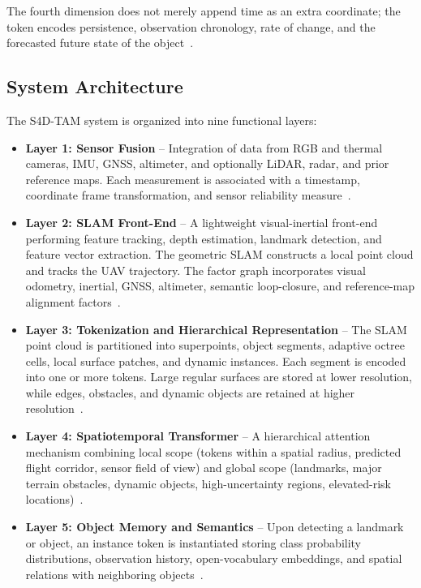 The fourth dimension does not merely append time as an extra coordinate; the token encodes persistence, observation chronology, rate of change, and the forecasted future state of the object~\cite{pomianek2026s4dtam, zheng2024gaussianad, wang2024occsora, ma2023cam4docc, chen2024riskoccupancy}.

\subsection{System Architecture}
\label{subsec:architecture}

The S4D-TAM system is organized into nine functional layers:
\begin{itemize}
  \item \textbf{Layer 1: Sensor Fusion} -- Integration of data from RGB and thermal cameras, IMU, GNSS, altimeter, and optionally LiDAR, radar, and prior reference maps. Each measurement is associated with a timestamp, coordinate frame transformation, and sensor reliability measure~\cite{pomianek2026s4dtam}.
  \item \textbf{Layer 2: SLAM Front-End} -- A lightweight visual-inertial front-end performing feature tracking, depth estimation, landmark detection, and feature vector extraction. The geometric SLAM constructs a local point cloud and tracks the UAV trajectory. The factor graph incorporates visual odometry, inertial, GNSS, altimeter, semantic loop-closure, and reference-map alignment factors~\cite{liu2024slideslam, tao2024active, liu2022largescale}.
  \item \textbf{Layer 3: Tokenization and Hierarchical Representation} -- The SLAM point cloud is partitioned into superpoints, object segments, adaptive octree cells, local surface patches, and dynamic instances. Each segment is encoded into one or more tokens. Large regular surfaces are stored at lower resolution, while edges, obstacles, and dynamic objects are retained at higher resolution~\cite{li2024hislam, tian2024same, xiang2021customizable, zhang2021you, he2024efficient}.
  \item \textbf{Layer 4: Spatiotemporal Transformer} -- A hierarchical attention mechanism combining local scope (tokens within a spatial radius, predicted flight corridor, sensor field of view) and global scope (landmarks, major terrain obstacles, dynamic objects, high-uncertainty regions, elevated-risk locations)~\cite{yu2025driveoccworld, silva2024s2tpvformer, liao2025i2world, pcpnet2024}.
  \item \textbf{Layer 5: Object Memory and Semantics} -- Upon detecting a landmark or object, an instance token is instantiated storing class probability distributions, observation history, open-vocabulary embeddings, and spatial relations with neighboring objects~\cite{li2024hislam, cai2024neusis, haghighi2024ovoslam}.

\end{itemize}
